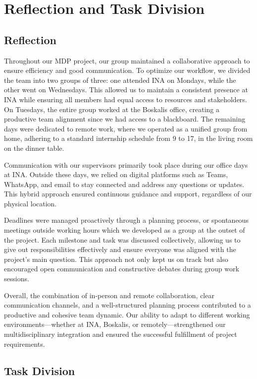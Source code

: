 \chapter{Reflection and Task Division}
\label{chapter:Reflection and Task Division}

\section{Reflection}
Throughout our MDP project, our group maintained a collaborative approach to ensure efficiency and good communication. To optimize our workflow, we divided the team into two groups of three: one attended INA on Mondays, while the other went on Wednesdays. This allowed us to maintain a consistent presence at INA while ensuring all members had equal access to resources and stakeholders. On Tuesdays, the entire group worked at the Boskalis office, creating a productive team alignment since we had access to a blackboard. The remaining days were dedicated to remote work, where we operated as a unified group from home, adhering to a standard internship schedule from 9 to 17, in the living room on the dinner table.


Communication with our supervisors primarily took place during our office days at INA. Outside these days, we relied on digital platforms such as Teams, WhatsApp, and email to stay connected and address any questions or updates. This hybrid approach ensured continuous guidance and support, regardless of our physical location.


Deadlines were managed proactively through a planning process, or spontaneous meetings outside working hours which we developed as a group at the outset of the project. Each milestone and task was discussed collectively, allowing us to give out responsibilities effectively and ensure everyone was aligned with the project’s main question. This approach not only kept us on track but also encouraged open communication and constructive debates during group work sessions.


Overall, the combination of in-person and remote collaboration, clear communication channels, and a well-structured planning process contributed to a productive and cohesive team dynamic. Our ability to adapt to different working environments—whether at INA, Boskalis, or remotely—strengthened our multidisciplinary integration and ensured the successful fulfillment of project requirements.

\section{Task Division}


